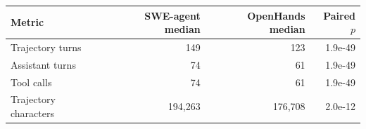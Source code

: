\begin{tabular}{lrrr}
\toprule
Metric & SWE-agent median & OpenHands median & Paired $p$ \\
\midrule
Trajectory turns & 149 & 123 & 1.9e-49 \\
Assistant turns & 74 & 61 & 1.9e-49 \\
Tool calls & 74 & 61 & 1.9e-49 \\
Trajectory characters & 194,263 & 176,708 & 2.0e-12 \\
\bottomrule
\end{tabular}
